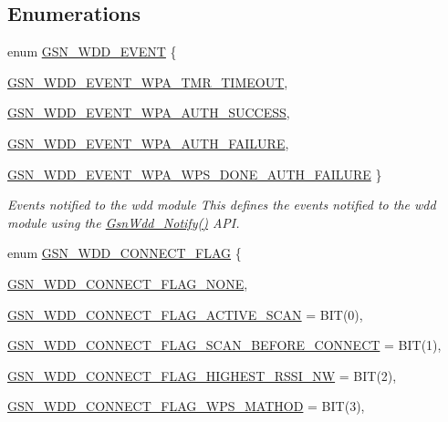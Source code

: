 \subsection*{Enumerations}
\begin{DoxyCompactItemize}
\item 
enum \hyperlink{a00677_ga1ff070ddd12f2dfd9bc0e26f84b4888c}{GSN\_\-WDD\_\-EVENT} \{ \par
\hyperlink{a00677_gga1ff070ddd12f2dfd9bc0e26f84b4888ca6b7e7c037214433fddbf87661ca4dbc3}{GSN\_\-WDD\_\-EVENT\_\-WPA\_\-TMR\_\-TIMEOUT}, 
\par
\hyperlink{a00677_gga1ff070ddd12f2dfd9bc0e26f84b4888cae1fbc62d6325825bd6ed267da380993a}{GSN\_\-WDD\_\-EVENT\_\-WPA\_\-AUTH\_\-SUCCESS}, 
\par
\hyperlink{a00677_gga1ff070ddd12f2dfd9bc0e26f84b4888ca06cef12a6710a11996300ff642b2549e}{GSN\_\-WDD\_\-EVENT\_\-WPA\_\-AUTH\_\-FAILURE}, 
\par
\hyperlink{a00677_gga1ff070ddd12f2dfd9bc0e26f84b4888cae071f6b63ae7b67fffe82fbd0129a0b1}{GSN\_\-WDD\_\-EVENT\_\-WPA\_\-WPS\_\-DONE\_\-AUTH\_\-FAILURE}
 \}
\begin{DoxyCompactList}\small\item\em Events notified to the wdd module This defines the events notified to the wdd module using the \hyperlink{a00677_ga3b57a234af35c0dc77fa3760a2f3f07f}{GsnWdd\_\-Notify()} API. \end{DoxyCompactList}\item 
enum \hyperlink{a00677_ga2846a7c5251eb6332e71299cef92d003}{GSN\_\-WDD\_\-CONNECT\_\-FLAG} \{ \par
\hyperlink{a00677_gga2846a7c5251eb6332e71299cef92d003a3d40d1cda052d834eee33e420a447d6c}{GSN\_\-WDD\_\-CONNECT\_\-FLAG\_\-NONE}, 
\par
\hyperlink{a00677_gga2846a7c5251eb6332e71299cef92d003a60e8304e346703de8449ce4cb231deae}{GSN\_\-WDD\_\-CONNECT\_\-FLAG\_\-ACTIVE\_\-SCAN} =  BIT(0), 
\par
\hyperlink{a00677_gga2846a7c5251eb6332e71299cef92d003a4090f08cff9462cb869860c9201868f8}{GSN\_\-WDD\_\-CONNECT\_\-FLAG\_\-SCAN\_\-BEFORE\_\-CONNECT} =  BIT(1), 
\par
\hyperlink{a00677_gga2846a7c5251eb6332e71299cef92d003a732819d8713c91ae637a858fc9192373}{GSN\_\-WDD\_\-CONNECT\_\-FLAG\_\-HIGHEST\_\-RSSI\_\-NW} =  BIT(2), 
\par
\hyperlink{a00677_gga2846a7c5251eb6332e71299cef92d003aed7be53eaf3c29ba59635c83e133911e}{GSN\_\-WDD\_\-CONNECT\_\-FLAG\_\-WPS\_\-MATHOD} =  BIT(3), 
\par

\end{DoxyCompactItemize}
